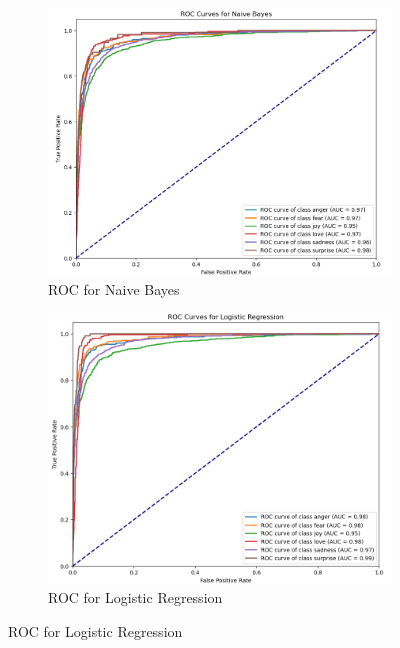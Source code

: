 \begin{figure}[h!]
	\centering
	\begin{subfigure}[b]{0.45\textwidth}
		\centering
		\includegraphics[width=\textwidth]{images/roc_naive_bayes.png}
		\caption{ROC for Naive Bayes}
		\label{fig:roc_naive_bayes}
	\end{subfigure}
	\hfill
	\begin{subfigure}[b]{0.45\textwidth}
		\centering
		\includegraphics[width=\textwidth]{images/roc_logistic_regression.png}
		\caption{ROC for Logistic Regression}
		\label{fig:roc_logistic_regression}
	\end{subfigure}
	

\end{figure}
